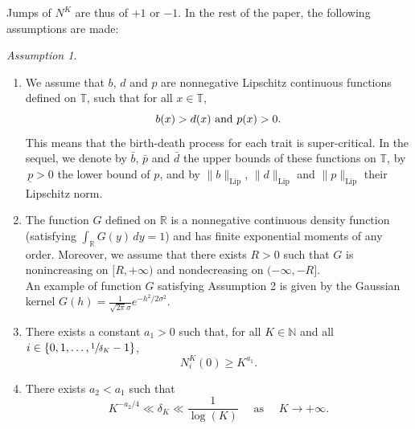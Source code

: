 \documentclass[10pt]{amsart}
\theoremstyle{plain}
\theoremstyle{remark}
\newtheorem{hyp}[theorem]{Assumption}
\newcommand\T{\mathbb{T}}
\newcommand\N{\mathbb{N}}
\newcommand\R{\mathbb{R}}
\begin{document}
{Jumps of $N^K$ are thus of $+1$ or $-1$. In the rest of the paper, the following assumptions are made:}

\skpt
\begin{hyp}\label{hypmodele}
\begin{enumerate}
\item\label{hypmodele1}
We assume that $b$, $d$ and $p$ are nonnegative Lipschitz continuous functions defined on $\T$, such that for all $x\in\T$,
\begin{equation*}%
b(x)>d(x) \hbox{ and } p(x)>0.
\end{equation*}
This means that the birth-death process for each trait is super-critical. In the sequel, we denote by $\bar{b}$, $\bar{p}$ and $\bar{d}$ the upper bounds of these functions on $\T$, by $\,\underline p>0$ the lower bound of $p$, and by $\|b\|_{\text{Lip}}$, $\|d\|_{\text{Lip}}$ and $\|p\|_{\text{Lip}}$ their Lipschitz norm.

\item\label{hypmodele2}
The function $G$ defined on $\mathbb{R}$ is a nonnegative continuous density function (satisfying $\int_\R G(y)\,dy=1$) and has finite exponential moments of any order. Moreover, we assume that there exists $R>0$ such that $G$ is nonincreasing on $[R,+\infty)$ and nondecreasing on $(-\infty,-R]$.\\
An example of function $G$ satisfying Assumption 2 is given by the Gaussian kernel $G(h)=\frac{1}{\sqrt{2\pi}\sigma}e^{-h^2/2\sigma^2}$.

\item\label{hypmodele3}
There exists a constant $a_1>0$ such that, for all $K\in \N$ and all $i\in\{0, 1,\dots, \sfrac{1}{\delta_K}-1\}$,
\begin{equation}\label{hyp:condinit}
N^K_i(0)\geq K^{a_1}.
\end{equation}

\item\label{hypmodele4}
There exists $a_2<a_1$ such that
\begin{equation}\label{hyp:deltaK}
K^{-a_2/4}\ll \delta_K\ll \frac{1}{\log(K)}\quad \mbox{ as }\quad K\to +\infty.
\end{equation}
\end{enumerate}
\end{hyp}
\end{document}

